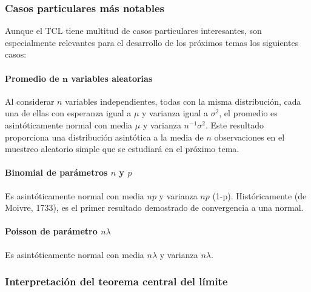 \documentclass[
]{article}
\begin{document}
\subsubsection{Casos particulares más notables}\label{casos-particulares-muxe1s-notables}

Aunque el TCL tiene multitud de casos particulares interesantes, son especialmente relevantes para el desarrollo de los próximos temas los siguientes casos:

\paragraph{\texorpdfstring{Promedio de \(\boldsymbol{n}\) variables aleatorias}{Promedio de \textbackslash boldsymbol\{n\} variables aleatorias}}\label{promedio-de-boldsymboln-variables-aleatorias}

Al considerar \(n\) variables independientes, todas con la misma distribución, cada una de ellas con esperanza igual a \(\mu\) y varianza igual a \(\sigma^{2}\), el promedio es asintóticamente normal con media \(\mu\) y varianza \(n^{-1} \sigma^{2}\). Este resultado proporciona una distribución asintótica a la media de \(n\) observaciones en el muestreo aleatorio simple que se estudiará en el próximo tema.

\paragraph{\texorpdfstring{Binomial de parámetros \(n\) y \(p\)}{Binomial de parámetros n y p}}\label{binomial-de-paruxe1metros-n-y-p}

Es asintóticamente normal con media \(n p\) y varianza \(n p\) (1-p). Históricamente (de Moivre, 1733), es el primer resultado demostrado de convergencia a una normal.

\paragraph{\texorpdfstring{Poisson de parámetro \(n \lambda\)}{Poisson de parámetro n \textbackslash lambda}}\label{poisson-de-paruxe1metro-n-lambda}

Es asintóticamente normal con media \(n \lambda\) y varianza \(n \lambda\).

\subsubsection{Interpretación del teorema central del límite}\label{interpretaciuxf3n-del-teorema-central-del-luxedmite}
\end{document}
